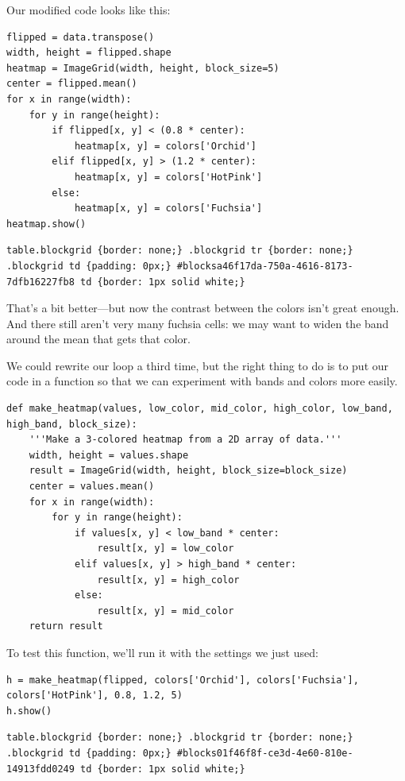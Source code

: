 \documentclass{book}
\begin{document}
Our modified code looks like this:

\begin{verbatim}
flipped = data.transpose()
width, height = flipped.shape
heatmap = ImageGrid(width, height, block_size=5)
center = flipped.mean()
for x in range(width):
    for y in range(height):
        if flipped[x, y] < (0.8 * center):
            heatmap[x, y] = colors['Orchid']
        elif flipped[x, y] > (1.2 * center):
            heatmap[x, y] = colors['HotPink']
        else:
            heatmap[x, y] = colors['Fuchsia']
heatmap.show()
\end{verbatim}

\begin{verbatim}
table.blockgrid {border: none;} .blockgrid tr {border: none;} .blockgrid td {padding: 0px;} #blocksa46f17da-750a-4616-8173-7dfb16227fb8 td {border: 1px solid white;}
\end{verbatim}

That's a bit better---but now the contrast between the colors isn't
great enough. And there still aren't very many fuchsia cells: we may
want to widen the band around the mean that gets that color.

We could rewrite our loop a third time, but the right thing to do is to
put our code in a function so that we can experiment with bands and
colors more easily.

\begin{verbatim}
def make_heatmap(values, low_color, mid_color, high_color, low_band, high_band, block_size):
    '''Make a 3-colored heatmap from a 2D array of data.'''
    width, height = values.shape
    result = ImageGrid(width, height, block_size=block_size)
    center = values.mean()
    for x in range(width):
        for y in range(height):
            if values[x, y] < low_band * center:
                result[x, y] = low_color
            elif values[x, y] > high_band * center:
                result[x, y] = high_color
            else:
                result[x, y] = mid_color
    return result
\end{verbatim}

To test this function, we'll run it with the settings we just used:

\begin{verbatim}
h = make_heatmap(flipped, colors['Orchid'], colors['Fuchsia'], colors['HotPink'], 0.8, 1.2, 5)
h.show()
\end{verbatim}

\begin{verbatim}
table.blockgrid {border: none;} .blockgrid tr {border: none;} .blockgrid td {padding: 0px;} #blocks01f46f8f-ce3d-4e60-810e-14913fdd0249 td {border: 1px solid white;}
\end{verbatim}
\end{document}

